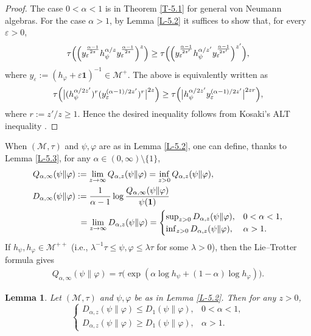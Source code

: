 \documentclass[12pt]{article}
\newtheorem{lemma}[theorem]{Lemma}
\theoremstyle{definition}
\theoremstyle{remark}
\numberwithin{equation}{section}
\def\Me{\mathcal M}
\def\ffi{\varphi}
\def\1{\mathbf{1}}
\def\eps{\varepsilon}
\begin{document}
\begin{proof}
The case $0<\alpha<1$ is in Theorem \ref{T-5.1} for general von Neumann algebras.
For the case $\alpha>1$, by Lemma \ref{L-5.2} it suffices to show that, for every $\eps>0$,
\[
\tau\Bigl(\Bigl(y_\eps^{\alpha-1\over2z}h_\psi^{\alpha/z}y_\eps^{\alpha-1\over2z}\Bigr)^z\Bigr)
\ge\tau\Bigl(\Bigl(y_\eps^{\alpha-1\over2z'}h_\psi^{\alpha/z'}y_\eps^{\alpha-1\over2z'}\Bigr)^{z'}\Bigr),
\]
where $y_\eps:=(h_\ffi+\eps\1)^{-1}\in\Me^+$. The above is equivalently written as
\[
\tau\Bigl(\big|(h_\psi^{\alpha/2z'})^r(y_\eps^{(\alpha-1)/2z'})^r\big|^{2z}\Bigr)
\ge\tau\Bigl(\big|h_\psi^{\alpha/2z'} y_\eps^{(\alpha-1)/2z'}\big|^{2zr}\Bigr),
\]
where $r:=z'/z\ge1$. Hence the desired inequality follows from Kosaki's ALT inequality
\cite[Corollary 3]{kosaki1992aninequality}.
\end{proof}

When $(\Me,\tau)$ and $\psi,\ffi$ are as in Lemma \ref{L-5.2}, one can define, thanks to
Lemma \ref{L-5.3}, for any $\alpha\in(0,\infty)\setminus\{1\}$,
\begin{align}
Q_{\alpha,\infty}(\psi\|\ffi)&:=\lim_{z\to\infty}Q_{\alpha,z}(\psi\|\ffi)
=\inf_{z>0}Q_{\alpha,z}(\psi\|\ffi), \nonumber\\
D_{\alpha,\infty}(\psi\|\ffi)&:={1\over\alpha-1}\log{Q_{\alpha,\infty}(\psi\|\ffi)\over\psi(\1)} \nonumber\\
&\ =\lim_{z\to\infty}D_{\alpha,z}(\psi\|\ffi)
=\begin{cases}\sup_{z>0}D_{\alpha,z}(\psi\|\ffi), & \text{$0<\alpha<1$},\\
\inf_{z>0}D_{\alpha,z}(\psi\|\ffi), & \text{$\alpha>1$}.\end{cases} \label{F-5.9}
\end{align}
If $h_\psi,h_\ffi\in\Me^{++}$ (i.e., $\lambda^{-1}\tau\le\psi,\ffi\le\lambda\tau$ for some $\lambda>0$), then
the Lie--Trotter formula gives
\begin{align}\label{F-5.10}
Q_{\alpha,\infty}(\psi\|\ffi)=\tau\bigl(\exp(\alpha\log h_\psi+(1-\alpha)\log h_\ffi)\bigr).
\end{align}

\begin{lemma}\label{L-5.4}
Let $(\Me,\tau)$ and $\psi,\ffi$ be as in Lemma \ref{L-5.2}. Then for any $z>0$,
\[
\begin{cases}
D_{\alpha,z}(\psi\|\ffi)\le D_1(\psi\|\ffi), & \text{$0<\alpha<1$},\\
D_{\alpha,z}(\psi\|\ffi)\ge D_1(\psi\|\ffi), & \text{$\alpha>1$}.
\end{cases}
\]
\end{lemma}
\end{document}
